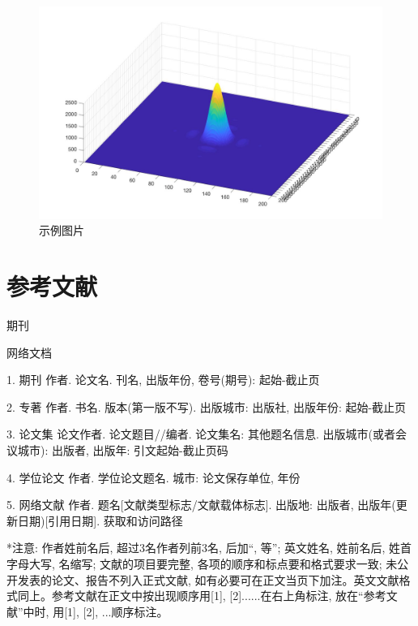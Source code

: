 \documentclass[UTF8,openany,AutoFakeBold,AutoFakeSlant,cs4size]{ctexbook}
\begin{document}
\begin{figure}[h]
\centering
\includegraphics[width=12cm]{Sample.jpg}
\caption{示例图片}
\label{fig:sample}
\end{figure}
\clearpage





\small
\linespread{1}\selectfont
\chapter*{参考文献}
\noindent
\begin{enumerate}[{[1]}]
\small
	\item 期刊
	\item 网络文档
\end{enumerate}

1.	期刊  作者. 论文名. 刊名, 出版年份, 卷号(期号): 起始-截止页

2.	专著  作者. 书名. 版本(第一版不写). 出版城市: 出版社, 出版年份: 起始-截止页

3.	论文集  论文作者. 论文题目//编者. 论文集名: 其他题名信息. 出版城市(或者会议城市): 出版者, 出版年: 引文起始-截止页码

4.	学位论文  作者. 学位论文题名. 城市: 论文保存单位, 年份

5.	网络文献  作者. 题名[文献类型标志/文献载体标志]. 出版地: 出版者, 出版年(更新日期)[引用日期]. 获取和访问路径

*注意: 作者姓前名后, 超过3名作者列前3名, 后加“, 等”; 英文姓名, 姓前名后, 姓首字母大写, 名缩写; 文献的项目要完整, 各项的顺序和标点要和格式要求一致; 未公开发表的论文、报告不列入正式文献, 如有必要可在正文当页下加注。英文文献格式同上。参考文献在正文中按出现顺序用[1], [2]......在右上角标注, 放在“参考文献”中时, 用[1], [2], ...顺序标注。
\end{document}
